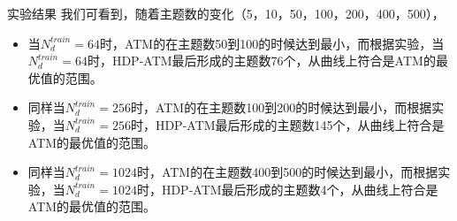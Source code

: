 \documentclass[presentation]{beamer}
\begin{document}
\begin{frame}[label={sec:orgheadline14}]{实验结果}
我们可看到，随着主题数的变化（5，10，50，100，200，400，500），
\begin{itemize}
\item 当\(N_d^{train}=64\)时，ATM的在主题数50到100的时候达到最小，而根据实验，当\(N_d^{train}=64\)时，HDP-ATM最后形成的主题数76个，从曲线上符合是ATM的最优值的范围。
\item 同样当\(N_d^{train}=256\)时，ATM的在主题数100到200的时候达到最小，而根据实验，当\(N_d^{train}=256\)时，HDP-ATM最后形成的主题数145个，从曲线上符合是ATM的最优值的范围。
\item 同样当\(N_d^{train}=1024\)时，ATM的在主题数400到500的时候达到最小，而根据实验，当\(N_d^{train}=1024\)时，HDP-ATM最后形成的主题数4个，从曲线上符合是ATM的最优值的范围。
\end{itemize}
\end{frame}
\end{document}

